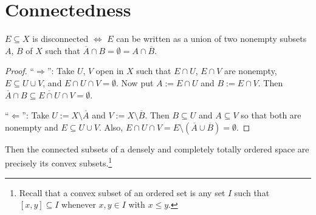 	
	
	
\section{Connectedness}

	\begin{lem}
		$E\subseteq X$ is disconnected $\iff$ $E$ can be written as a union of two nonempty subsets $A$, $B$ of $X$ such that $\overline A\cap B = \emptyset = A\cap\overline B$.
	\end{lem}
	
	\begin{proof}
		``$\Rightarrow$'': Take $U$, $V$ open in $X$ such that $E\cap U$, $E\cap V$ are nonempty, $E\subseteq U\cup V$, and $E\cap U\cap V = \emptyset$. Now put $A := E\cap U$ and $B := E\cap V$. Then $\overline A\cap B\subseteq \overline{E\cap U}\cap V = \emptyset$.
		
		``$\Leftarrow$'': Take $U := X\setminus \overline A$ and $V := X\setminus \overline B$. Then $B\subseteq U$ and $A\subseteq V$ so that both are nonempty and $E\subseteq U\cup V$. Also, $E\cap U\cap V = E\setminus(\overline A\cup\overline B) = \emptyset$.
	\end{proof}
	
	\begin{prp}\label{PRP: linear continua are connected}
		Then the connected subsets of a densely and completely totally ordered space are precisely its convex subsets.\footnote{Recall that a convex subset of an ordered set is any set $I$ such that $[x, y]\subseteq I$ whenever $x, y\in I$ with $x\le y$.}
	\end{prp}
	
